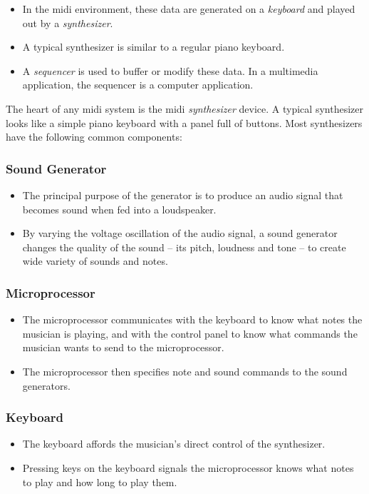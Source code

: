 \begin{itemize}
	\item In the \gls{midi} environment, these data are generated on a \textit{keyboard} and played out by a \textit{synthesizer}.
	\item A typical synthesizer is similar to a regular piano keyboard.
	\item A \textit{sequencer} is used to buffer or modify these data. In a multimedia application, the sequencer is a computer application.
\end{itemize}

The heart of any \gls{midi} system is the \gls{midi} \textit{synthesizer} device. A typical synthesizer looks like a simple piano keyboard with a panel full of buttons. Most synthesizers have the following common components:

\subsubsection*{Sound Generator}
\begin{itemize}
	\item The principal purpose of the generator is to produce an audio signal that
	becomes sound when fed into a loudspeaker. 
	
	\item By varying the voltage oscillation of the audio signal, a sound generator changes the quality of the sound – its pitch, loudness and tone – to create wide variety of
	sounds and notes.
\end{itemize}

\subsubsection*{Microprocessor}
\begin{itemize}
	\item The microprocessor communicates with the keyboard to know what notes the musician is playing, and with the control panel to know what
	commands the musician wants to send to the microprocessor. 
	\item The microprocessor then specifies note and sound commands to the sound generators.
\end{itemize}


\subsubsection*{Keyboard}
\begin{itemize}
	\item The keyboard affords the musician's direct control of the synthesizer.
	\item Pressing keys on the keyboard signals the microprocessor knows what
	notes to play and how long to play them.
\end{itemize}


